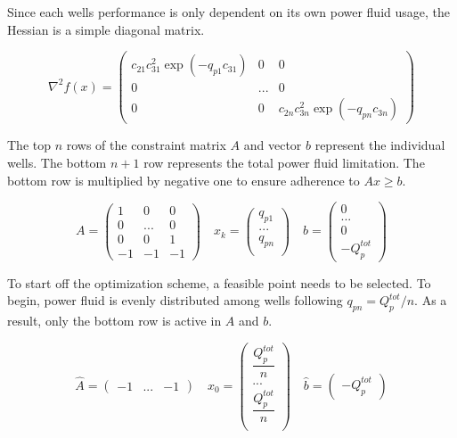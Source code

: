 \documentclass{article}
\begin{document}
Since each wells performance is only dependent on its own power fluid usage, the Hessian is a simple diagonal matrix.

\begin{equation*}
    \nabla^{2} f(x) = 
    \begin{pmatrix}
    c_{21} c_{31}^{2} \exp{(-q_{p1} c_{31})} & 0 & 0 \\[6pt]
    0 & ... & 0 \\[6pt]
    0 & 0 & c_{2n} c_{3n}^{2} \exp{(-q_{pn} c_{3n})} 
    \end{pmatrix}
\end{equation*}

The top $n$ rows of the constraint matrix $A$ and vector $b$ represent the individual wells. The bottom $n+1$ row represents the total power fluid limitation. The bottom row is multiplied by negative one to ensure adherence to $Ax \geq b$.

\begin{equation*}
    A = 
    \begin{pmatrix}
    1 & 0 & 0 \\[4pt]
    0 & ... & 0\\[4pt]
    0 & 0 & 1 \\[4pt]
    -1 & -1 & -1
    \end{pmatrix} \quad
    x_{k} = 
    \begin{pmatrix}
    q_{p1} \\[4pt]
    ... \\[4pt]
    q_{pn} \\
    \end{pmatrix} \quad
    b = 
    \begin{pmatrix}
    0 \\[4pt]
    ... \\[4pt]
    0 \\[4pt]
    -Q_p^{tot}
    \end{pmatrix}
\end{equation*}

To start off the optimization scheme, a feasible point needs to be selected. To begin, power fluid is evenly distributed among wells following $q_{pn} = Q_p^{tot}/n$. As a result, only the bottom row is active in $A$ and $b$.

\begin{equation*}
    \hat{A} = 
    \begin{pmatrix}
    -1 & ... & -1
    \end{pmatrix} \quad
    x_{0} = 
    \begin{pmatrix}
    \dfrac{Q_p^{tot}}{n} \\[4pt]
    ... \\[4pt]
    \dfrac{Q_p^{tot}}{n} \\
    \end{pmatrix} \quad
    \hat{b} = 
    \begin{pmatrix}
    -Q_p^{tot}
    \end{pmatrix}
\end{equation*}
\end{document}
